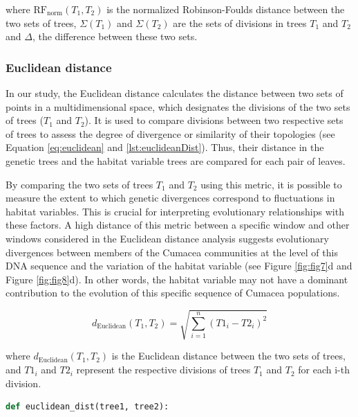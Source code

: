 {where $ \text{RF}_{\text{norm}}(T_1, T_2)$ is the normalized Robinson-Foulds distance between the two sets of trees, $\Sigma(T_1)$ and $\Sigma(T_2)$ are the sets of divisions in trees $T_1$ and $T_2$ and $ \Delta $, the difference between these two sets.

\subsubsection{Euclidean distance}\label{euclidean}
In our study, the Euclidean distance calculates the distance between two sets of points in a multidimensional space, which designates the divisions of the two sets of trees ($T_1$ and $T_2$). It is used to compare divisions between two respective sets of trees to assess the degree of divergence or similarity of their topologies (see Equation \eqref{eq:euclidean} and \autoref{lst:euclideanDist}). Thus, their distance in the genetic trees and the habitat variable trees are compared for each pair of leaves.

By comparing the two sets of trees $T_1$ and $T_2$ using this metric, it is possible to measure the extent to which genetic divergences correspond to fluctuations in habitat variables. This is crucial for interpreting evolutionary relationships with these factors. A high distance of this metric between a specific window and other windows considered in the Euclidean distance analysis suggests evolutionary divergences between members of the Cumacea communities at the level of this DNA sequence and the variation of the habitat variable (see Figure \ref{fig:fig7}d and Figure \ref{fig:fig8}d). In other words, the habitat variable may not have a dominant contribution to the evolution of this specific sequence of Cumacea populations.

\begin{equation}\label{eq:euclidean}
    d_{\text{Euclidean}}(T_1, T_2) = \sqrt{\sum_{i=1}^{n} (T1_i - T2_i)^2}
\end{equation}

where $ d_{\text{Euclidean}}(T_1, T_2)$ is the Euclidean distance between the two sets of trees, and $T1_i$ and $T2_i$ represent the respective divisions of trees $T_1$ and $T_2$ for each i-th division.

\begin{lstlisting}[label=lst:euclideanDist,language=Python,caption=Python script for calculating the Euclidean distance using the ete3 and the dendropy packages in the aPhyloGeo package. The Newick format represents the phylogenetic and variable trees in text form.]
def euclidean_dist(tree1, tree2):


\end{lstlisting}}
